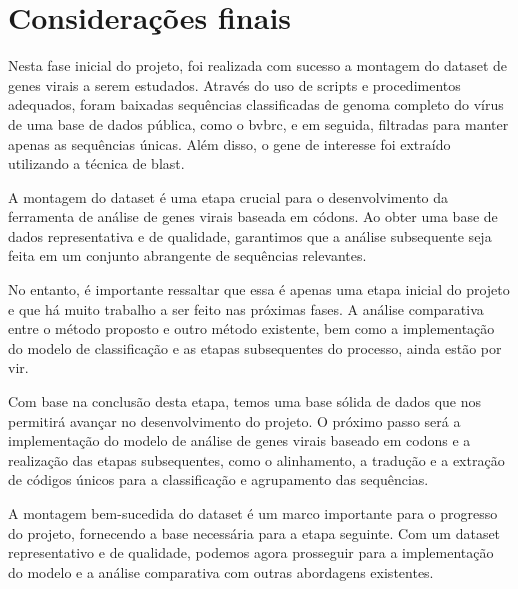 \chapter{Considerações finais}

Nesta fase inicial do projeto, foi realizada com sucesso a montagem do dataset de genes virais a serem estudados. Através do uso de scripts e procedimentos adequados, foram baixadas sequências classificadas de genoma completo do vírus de uma base de dados pública, como o \gls{bvbrc}, e em seguida, filtradas para manter apenas as sequências únicas. Além disso, o gene de interesse foi extraído utilizando a técnica de blast.

A montagem do dataset é uma etapa crucial para o desenvolvimento da ferramenta de análise de genes virais baseada em códons. Ao obter uma base de dados representativa e de qualidade, garantimos que a análise subsequente seja feita em um conjunto abrangente de sequências relevantes.

No entanto, é importante ressaltar que essa é apenas uma etapa inicial do projeto e que há muito trabalho a ser feito nas próximas fases. A análise comparativa entre o método proposto e outro método existente, bem como a implementação do modelo de classificação e as etapas subsequentes do processo, ainda estão por vir.

Com base na conclusão desta etapa, temos uma base sólida de dados que nos permitirá avançar no desenvolvimento do projeto. O próximo passo será a implementação do modelo de análise de genes virais baseado em codons e a realização das etapas subsequentes, como o alinhamento, a tradução e a extração de códigos únicos para a classificação e agrupamento das sequências.

A montagem bem-sucedida do dataset é um marco importante para o progresso do projeto, fornecendo a base necessária para a etapa seguinte. Com um dataset representativo e de qualidade, podemos agora prosseguir para a implementação do modelo e a análise comparativa com outras abordagens existentes.


